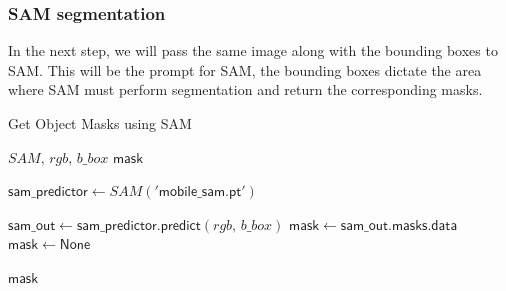 \subsubsection{SAM segmentation}
In the next step, we will pass the same image along with the bounding boxes to SAM. This will be the prompt for SAM, the bounding boxes dictate
 the area where SAM must perform segmentation and return the corresponding masks.
 \begin{Algorithmus}
  \caption{Get Object Masks using SAM}
  \label{alg:get_object_masks}
  \begin{algorithmic}
    \Require $\mathsf{\textit{SAM, rgb, b\_box}}$
    \Ensure $\mathsf{mask}$

    \State $\mathsf{sam\_predictor} \gets \mathsf{\textit{SAM}('mobile\_sam.pt')}$ 

        \State $\mathsf{sam\_out} \gets \mathsf{sam\_predictor.predict(\textit{rgb, b\_box})}$
        \State $\mathsf{mask} \gets \mathsf{sam\_out.masks.data}$
    \Else
        \State $\mathsf{mask} \gets \mathsf{None}$
    \EndIf

    \State \Return $\mathsf{mask}$
    
  \end{algorithmic}
\end{Algorithmus}

